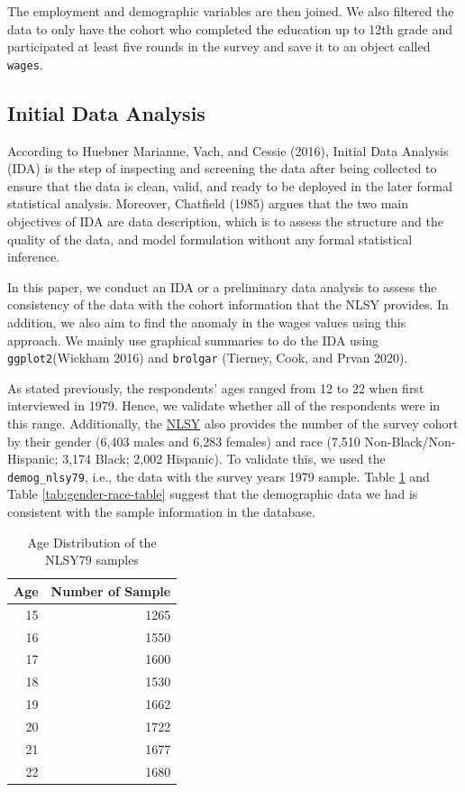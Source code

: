 \documentclass[12pt]{article}
\begin{document}
The employment and demographic variables are then joined. We also filtered the data to only have the cohort who completed the education up to 12th grade and participated at least five rounds in the survey and save it to an object called \texttt{wages}.

\hypertarget{initial-data-analysis}{%
\subsection{Initial Data Analysis}\label{initial-data-analysis}}

According to Huebner Marianne, Vach, and Cessie (2016), Initial Data Analysis (IDA) is the step of inspecting and screening the data after being collected to ensure that the data is clean, valid, and ready to be deployed in the later formal statistical analysis. Moreover, Chatfield (1985) argues that the two main objectives of IDA are data description, which is to assess the structure and the quality of the data, and model formulation without any formal statistical inference.

In this paper, we conduct an IDA or a preliminary data analysis to assess the consistency of the data with the cohort information that the NLSY provides. In addition, we also aim to find the anomaly in the wages values using this approach. We mainly use graphical summaries to do the IDA using \texttt{ggplot2}(Wickham 2016) and \texttt{brolgar} (Tierney, Cook, and Prvan 2020).

As stated previously, the respondents' ages ranged from 12 to 22 when first interviewed in 1979. Hence, we validate whether all of the respondents were in this range. Additionally, the \href{https://www.nlsinfo.org/content/cohorts/nlsy79/intro-to-the-sample/nlsy79-sample-introduction}{NLSY} also provides the number of the survey cohort by their gender (6,403 males and 6,283 females) and race (7,510 Non-Black/Non-Hispanic; 3,174 Black; 2,002 Hispanic). To validate this, we used the \texttt{demog\_nlsy79}, i.e., the data with the survey years 1979 sample. Table \ref{tab:age-table} and Table \ref{tab:gender-race-table} suggest that the demographic data we had is consistent with the sample information in the database.

\begin{table}

\caption{\label{tab:age-table}Age Distribution of the NLSY79 samples}
\centering
\begin{tabular}[t]{r|r}
\hline
Age & Number of Sample\\
\hline
15 & 1265\\
\hline
16 & 1550\\
\hline
17 & 1600\\
\hline
18 & 1530\\
\hline
19 & 1662\\
\hline
20 & 1722\\
\hline
21 & 1677\\
\hline
22 & 1680\\
\hline
\end{tabular}
\end{table}
\end{document}
